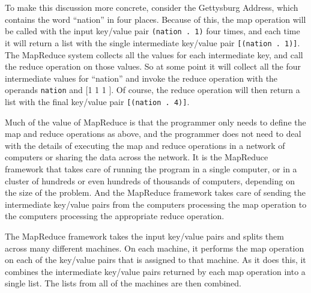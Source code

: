 To make this discussion more concrete, consider the Gettysburg Address,
which contains the word ``nation'' in four places. Because of this,
the map operation will be called with the input key/value pair \texttt{(nation~.~1)}
four times, and each time it will return a list with
the single intermediate key/value pair \texttt{[(nation~.~1)]}. The MapReduce
system collects all the values for each intermediate key, and call the reduce
operation on those values. So at some point it will collect all the four intermediate
values for ``nation'' and invoke the reduce operation with the operands
\texttt{nation} and {[1 1 1 ]}. Of course, the reduce operation will then
return a list with the final key/value pair \texttt{[(nation~.~4)]}.


Much of the value of MapReduce is that the programmer only needs to
define the map and reduce operations as above, and the programmer
does not need to deal with the details of executing the map and reduce
operations in a network of computers or sharing the data across the
network.  It is the MapReduce
framework that takes care of running the program in a single
computer, or in a cluster of hundreds or even hundreds of thousands
of computers, depending on the size of the problem. And the MapReduce
framework takes care of sending the intermediate key/value pairs
from the computers processing the map operation to the computers
processing the appropriate reduce operation.

The MapReduce framework
takes the input key/value pairs and splits them across many
different machines.  On each machine, it performs the map
operation on each of the key/value pairs that is assigned to
that machine.  As it does this, it combines the intermediate
key/value pairs returned by each map operation into a single
list.  The lists from all of the machines are then combined.

